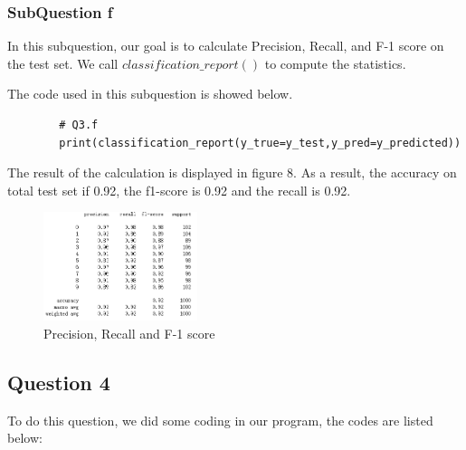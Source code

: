\documentclass[conference]{IEEEtran}
\begin{document}
	\subsubsection{SubQuestion f}
	In this subquestion, our goal is to calculate Precision, Recall, and F-1 score on the test set. We call $classification\_report()$ to compute the statistics. \par
	
	The code used in this subquestion is showed below. \par
	
	
	
	\begin{lstlisting}
		# Q3.f
		print(classification_report(y_true=y_test,y_pred=y_predicted))
	\end{lstlisting} \par
	The result of the calculation is displayed in figure 8. As a result, the accuracy on total test set if 0.92, the f1-score is 0.92 and the recall is 0.92.
	\begin{figure}[h] 
		\centering
		\includegraphics[width=0.4\textwidth]{./graphs/T1Q3f.png}
		\caption{Precision, Recall and F-1 score}
		\label{Fig.t1q3f}
	\end{figure}
	\subsection{Question 4}
	To do this question, we did some coding in our program, the codes are listed below:
	
\end{document}
